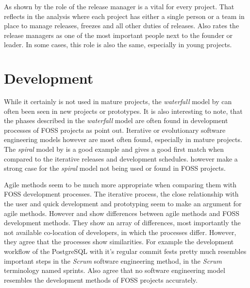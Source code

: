As shown by \textcite{Mockus2002} the role of the release manager is a vital
for every project. That reflects in the analysis where each project has either
a single person or a team in place to manage releases, freezes and all other
duties of releases. Also \textcite{Crowston2005} rates the release managers as
one of the most important people next to the founder or leader. In some cases,
this role is also the same, especially in young projects.


\section{Development} %

While it certainly is not used in mature projects, the \emph{waterfall} model
by \textcite{Royce1970} can often been seen in new projects or prototypes. It
is also interesting to note, that the phases described in the \emph{waterfall}
model are often found in development processes of \ac{FOSS} projects as
\textcite{Roets2007} point out. Iterative or evolutionary software engineering
models however are most often found, especially in mature projects. The
\emph{spiral} model by \textcite{Boehm1988} is a good example and gives a good
first match when compared to the iterative releases and development schedules.
\textcite{Roets2007} however make a strong case for the \emph{spiral} model not
being used or found in \ac{FOSS} projects.

Agile methods seem to be much more appropriate when comparing them with
\ac{FOSS} development processes. The iterative process, the close relationship
with the user and quick development and prototyping seem to make an argument
for agile methods. However \textcite{Warsta2003} and \textcite{Koch2004} show
differences between agile methods and \ac{FOSS} development methods. They show
an array of differences, most importantly the not available co-location of
developers, in which the processes differ. However, they agree that the
processes show similarities. For example the development workflow of the
PostgreSQL with it's regular commit fests pretty much resembles important steps
in the \emph{Scrum} software engineering method, in the \emph{Scrum}
terminology named sprints. Also \textcite{Roets2007} agree that no software
engineering model resembles the development methods of \ac{FOSS} projects
accurately.


